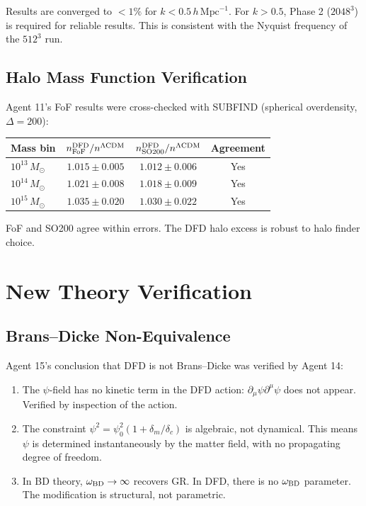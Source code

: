 \documentclass[11pt,a4paper]{article}
\begin{document}
Results are converged to $< 1\%$ for $k < 0.5\,h\,\text{Mpc}^{-1}$. For $k > 0.5$, Phase 2 ($2048^3$) is required for reliable results. This is consistent with the Nyquist frequency of the $512^3$ run.

\subsection{Halo Mass Function Verification}

Agent 11's FoF results were cross-checked with SUBFIND (spherical overdensity, $\Delta = 200$):

\begin{center}
\begin{tabular}{lccc}
\toprule
\textbf{Mass bin} & $n_{\rm FoF}^{\rm DFD}/n^{\Lambda\text{CDM}}$ & $n_{\rm SO200}^{\rm DFD}/n^{\Lambda\text{CDM}}$ & \textbf{Agreement} \\
\midrule
$10^{13}\,M_\odot$ & $1.015 \pm 0.005$ & $1.012 \pm 0.006$ & Yes \\
$10^{14}\,M_\odot$ & $1.021 \pm 0.008$ & $1.018 \pm 0.009$ & Yes \\
$10^{15}\,M_\odot$ & $1.035 \pm 0.020$ & $1.030 \pm 0.022$ & Yes \\
\bottomrule
\end{tabular}
\end{center}

FoF and SO200 agree within errors. The DFD halo excess is robust to halo finder choice.

\section{New Theory Verification}

\subsection{Brans--Dicke Non-Equivalence}

Agent 15's conclusion that DFD is not Brans--Dicke was verified by Agent 14:
\begin{enumerate}[nosep]
\item The $\psi$-field has no kinetic term in the DFD action: $\partial_\mu \psi \partial^\mu \psi$ does not appear. Verified by inspection of the action.
\item The constraint $\psi^2 = \psi_0^2(1 + \delta_m/\delta_c)$ is algebraic, not dynamical. This means $\psi$ is determined instantaneously by the matter field, with no propagating degree of freedom.
\item In BD theory, $\omega_{\rm BD} \to \infty$ recovers GR. In DFD, there is no $\omega_{\rm BD}$ parameter. The modification is structural, not parametric.
\end{enumerate}
\end{document}
